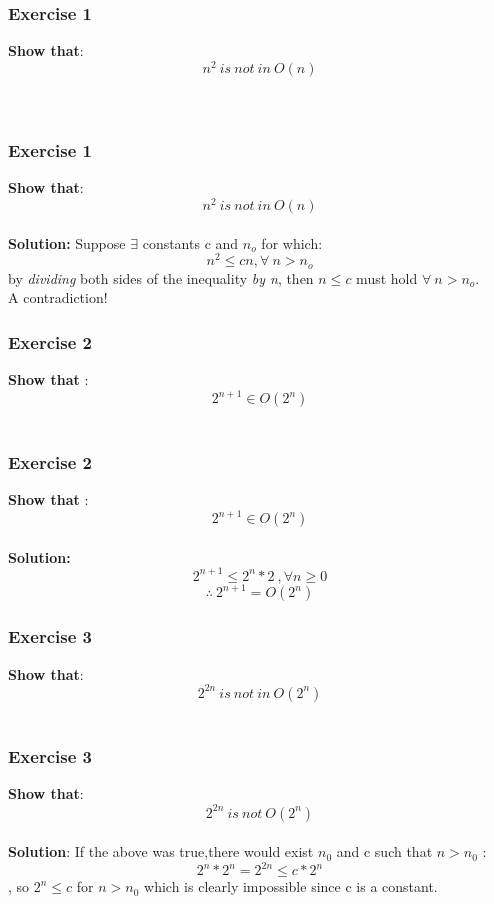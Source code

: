 \documentclass{beamer}
\begin{document}
 

\begin{frame}
\frametitle{Exercise 1}
 \textbf{Show that}: $$n^{2} \ is \ not\  in\ O(n) $$\\
 
\

\end{frame}

\begin{frame}
\frametitle{Exercise 1}
 \textbf{Show that}: $$n^{2} \ is \ not\ in\ O(n) $$\\
 
\textbf{Solution:} Suppose $\exists$ constants c and
$n_{o}$ for which: $$n^{2}\leq cn, \forall \ n > n_{o} $$ 
by \textit{dividing} both sides of the inequality \textit{by n},
then $n\leq c$ must hold $\forall \ n>n_{o}$.   \\

A contradiction!

\end{frame}


\begin{frame}
\frametitle{Exercise 2}
\textbf{Show that }: $$2^{n+1} \in O(2^n)$$ \\
 

\end{frame}


\begin{frame}
\frametitle{Exercise 2}
\textbf{Show that }: $$2^{n+1} \in O(2^n)$$ \\
 
\textbf{Solution:} $$2^{n+1}\leq 2^n*2 \ , \forall n\geq 0 $$ 
 $$\therefore \ 2^{n+1}=O(2^n)$$

\end{frame}
 

\begin{frame}
\frametitle{Exercise 3}
\textbf{Show that}: $$2^{2n}\ is \ not\ in\ O(2^n)$$\\
 


\end{frame}

\begin{frame}
\frametitle{Exercise 3}
\textbf{Show that}: $$2^{2n}\ is \ not \ O(2^n)$$\\
 
\textbf{Solution}: If the above was true,there would exist $n_{0}$ and c such that $n>n_{0}$ :
$$2^{n}*2^{n} =2^{2n} \leq c*2^n  $$ ,
so $2^{n}\leq c$ for $n>n_{0}$ which is clearly impossible since c is a constant. 

\end{frame}
\end{document}
